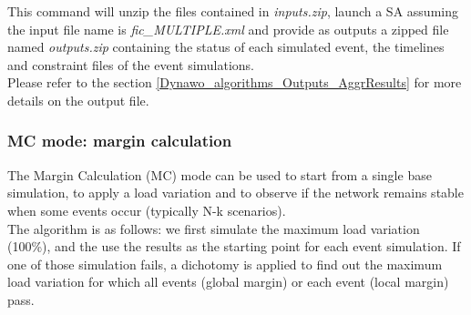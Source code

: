 \documentclass[a4paper, 12pt]{report}
\begin{document}
This command will unzip the files contained in \textit{inputs.zip}, launch a SA assuming the input file name is \textit{fic\_MULTIPLE.xml}
and provide as outputs a zipped file named \textit{outputs.zip} containing the status of each simulated event, 
the timelines and constraint files of the \Dynawo event simulations.\\

Please refer to the section \ref{Dynawo_algorithms_Outputs_AggrResults} for more details on the output file.


\subsubsection{MC mode: margin calculation}

The Margin Calculation (MC) mode can be used to start from a single base simulation, to apply a load variation and to observe 
if the network remains stable when some events occur (typically N-k scenarios).\\
The algorithm is as follows: we first simulate the maximum load variation (100\%), and the use the results as the starting point for each event simulation.
If one of those simulation fails, a dichotomy is applied to find out the maximum load variation for which all events (global margin) or each event (local margin) pass.\\
\end{document}
